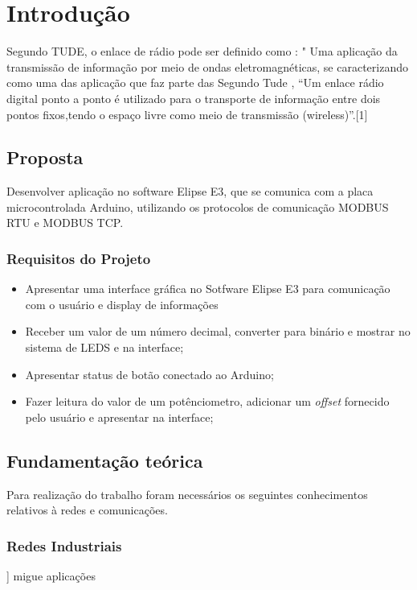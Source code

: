 
\chapter[Introdução]{Introdução}

Segundo TUDE, o enlace de rádio pode ser definido como : "
Uma aplicação da transmissão de informação por meio de ondas eletromagnéticas, se caracterizando como uma das aplicação que faz parte das Segundo Tude , “Um enlace rádio digital ponto a ponto é utilizado para o transporte de informação entre dois pontos fixos,tendo o espaço livre como meio de transmissão (wireless)”.[1]


\section{Proposta}\label{sec:motivacao}
Desenvolver aplicação no software Elipse E3, que se comunica com a placa microcontrolada Arduino, utilizando os protocolos de comunicação MODBUS RTU e MODBUS TCP.

\subsection{Requisitos do Projeto}
\begin{itemize}
\item Apresentar uma interface gráfica no Sotfware Elipse E3 para comunicação com o usuário e display de informações
\item Receber um valor de um número decimal, converter para binário e mostrar no sistema de LEDS e na interface;
\item Apresentar status de botão conectado ao Arduino;
\item Fazer leitura do valor de um potênciometro, adicionar um \textit{offset} fornecido pelo usuário e apresentar na interface;
\end{itemize}
\section{Fundamentação teórica}
Para realização do trabalho foram necessários os seguintes conhecimentos relativos à redes e comunicações.
\subsection{Redes Industriais}]
migue aplicações
